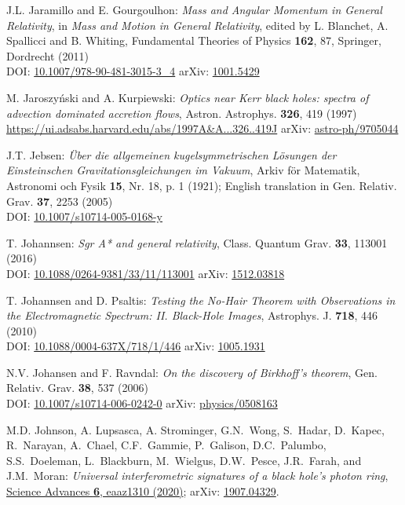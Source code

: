 \begin{thebibliography}{123}
J.L. Jaramillo and E. Gourgoulhon:
{\em Mass and Angular Momentum in General Relativity},
in \emph{Mass and Motion in General Relativity}, edited by L. Blanchet, A. Spallicci and B. Whiting, Fundamental Theories of Physics {\bf 162}, 87,
Springer, Dordrecht (2011) \\
DOI: \href{https://doi.org/10.1007/978-90-481-3015-3_4}{10.1007/978-90-481-3015-3\_4}\hfill
arXiv: \href{https://arxiv.org/abs/1001.5429}{1001.5429}

M. Jaroszy\'nski and A. Kurpiewski:
{\em Optics near Kerr black holes: spectra of advection dominated accretion flows},
Astron. Astrophys. {\bf 326}, 419 (1997)\\
\url{https://ui.adsabs.harvard.edu/abs/1997A&A...326..419J}\hfill
arXiv: \href{https://arxiv.org/abs/astro-ph/9705044}{astro-ph/9705044}

J.T. Jebsen:
{\em Über die allgemeinen kugelsymmetrischen Lösungen der Einsteinschen
Gravitationsgleichungen im Vakuum},
Arkiv för Matematik, Astronomi och Fysik {\bf 15}, Nr. 18, p. 1 (1921);
English translation in
Gen. Relativ. Grav. {\bf 37}, 2253 (2005)\\
DOI: \href{https://doi.org/10.1007/s10714-005-0168-y}{10.1007/s10714-005-0168-y}

T. Johannsen:
{\em Sgr A* and general relativity},
Class. Quantum Grav.  {\bf 33}, 113001 (2016)\\
DOI: \href{https://doi.org/10.1088/0264-9381/33/11/113001}{10.1088/0264-9381/33/11/113001}\hfill
arXiv: \href{https://arxiv.org/abs/1512.03818}{1512.03818}

T. Johannsen and D. Psaltis:
{\em Testing the No-Hair Theorem with Observations in the Electromagnetic Spectrum: II. Black-Hole Images},
Astrophys. J. {\bf 718}, 446 (2010)\\
DOI: \href{https://doi.org/10.1088/0004-637X/718/1/446}{10.1088/0004-637X/718/1/446}\hfill
arXiv: \href{https://arxiv.org/abs/1005.1931}{1005.1931}

N.V. Johansen and F. Ravndal:
{\em On the discovery of Birkhoff's theorem},
Gen. Relativ. Grav. {\bf 38}, 537 (2006)\\
DOI: \href{https://doi.org/10.1007/s10714-006-0242-0}{10.1007/s10714-006-0242-0}\hfill
arXiv: \href{https://arxiv.org/abs/physics/0508163}{physics/0508163}

M.D. Johnson, A. Lupsasca, A. Strominger, G.N.~Wong, S.~Hadar, D.~Kapec, R.~Narayan, A.~Chael,
C.F.~Gammie, P.~Galison, D.C.~Palumbo, S.S.~Doeleman, L.~Blackburn, M.~Wielgus, D.W.~Pesce,
J.R.~Farah, and J.M.~Moran:
{\em Universal interferometric signatures of a black hole's photon ring},
\href{https://doi.org/10.1126/sciadv.aaz1310}{Science Advances {\bf 6}, eaaz1310 (2020)};
arXiv: \href{https://arxiv.org/abs/1907.04329}{1907.04329}.


\end{thebibliography}
